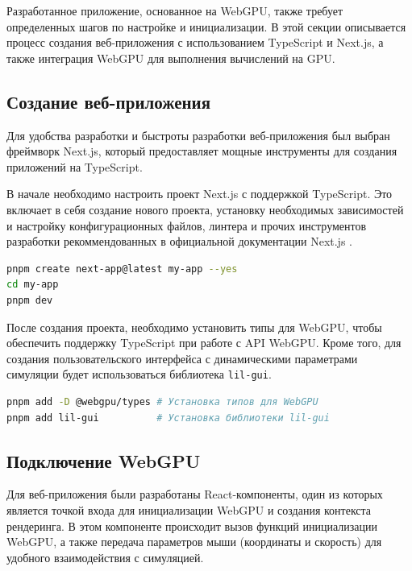 Разработанное приложение, основанное на WebGPU, также требует определенных шагов по настройке и инициализации. В этой секции описывается процесс создания веб-приложения с использованием TypeScript и Next.js, а также интеграция WebGPU для выполнения вычислений на GPU.

\subsection{Создание веб-приложения}

Для удобства разработки и быстроты разработки веб-приложения был выбран фреймворк Next.js, который предоставляет мощные инструменты для создания приложений на TypeScript.

В начале необходимо настроить проект Next.js с поддержкой TypeScript. Это включает в себя создание нового проекта, установку необходимых зависимостей и настройку конфигурационных файлов, линтера и прочих инструментов разработки рекоммендованных в официальной документации Next.js \cite{nextjsdocs}.

\newpage

\begin{lstlisting}[language=bash, caption=Создание нового проекта Next.js с TypeScript]
pnpm create next-app@latest my-app --yes
cd my-app
pnpm dev
\end{lstlisting}

После создания проекта, необходимо установить типы для WebGPU, чтобы обеспечить поддержку TypeScript при работе с API WebGPU. Кроме того, для создания пользовательского интерфейса с динамическими параметрами симуляции будет использоваться библиотека \texttt{lil-gui}.

\begin{lstlisting}[language=bash, caption=Установка зависимостей]
pnpm add -D @webgpu/types # Установка типов для WebGPU
pnpm add lil-gui          # Установка библиотеки lil-gui
\end{lstlisting}

\subsection{Подключение WebGPU}

Для веб-приложения были разработаны React-компоненты, один из которых является точкой входа для инициализации WebGPU и создания контекста рендеринга. В этом компоненте происходит вызов функций инициализации WebGPU, а также передача параметров мыши (координаты и скорость) для удобного взаимодействия с симуляцией.

